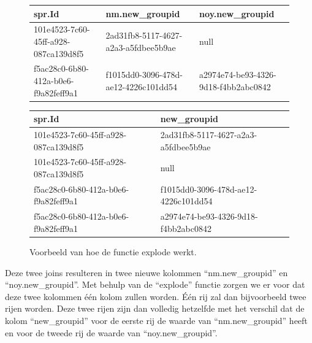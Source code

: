 \begin{figure}[H]%
    \centering
    \begin{tabularx}{0.9\textwidth}{ |X|X|X| }
        \hline
        \textbf{spr.Id} & \textbf{nm.new\_groupid} & \textbf{noy.new\_groupid} \\
        \hline 
        101e4523-7c60-45ff-a928-087ca139d8f5  & 2ad31fb8-5117-4627-a2a3-a5fdbee5b9ae & null  \\
        \hline
        f5ac28c0-6b80-412a-b0e6-f9a82feff9a1 & f1015dd0-3096-478d-ae12-4226c101dd54 & a2974e74-be93-4326-9d18-f4bb2abc0842 \\
        \hline
    \end{tabularx}
    
    \Bigg\downarrow
    
    \begin{tabularx}{0.9\textwidth}{ |X|X| }
        \hline
        \textbf{spr.Id} & \textbf{new\_groupid} \\
        \hline 
        101e4523-7c60-45ff-a928-087ca139d8f5  & 2ad31fb8-5117-4627-a2a3-a5fdbee5b9ae  \\
        \hline
        101e4523-7c60-45ff-a928-087ca139d8f5  & null  \\
        \hline
        f5ac28c0-6b80-412a-b0e6-f9a82feff9a1 & f1015dd0-3096-478d-ae12-4226c101dd54 \\
        \hline
        f5ac28c0-6b80-412a-b0e6-f9a82feff9a1 & a2974e74-be93-4326-9d18-f4bb2abc0842 \\
        \hline
    \end{tabularx}
    \caption{Voorbeeld van hoe de functie explode werkt.}
\end{figure}

Deze twee joins resulteren in twee nieuwe kolommen ``nm.new\_groupid'' en ``noy.new\_groupid''. Met behulp van de ``explode'' functie zorgen we er voor dat deze twee kolommen één kolom zullen worden. Één rij zal dan bijvoorbeeld twee rijen worden. Deze twee rijen zijn dan volledig hetzelfde met het verschil dat de kolom ``new\_groupid'' voor de eerste rij de waarde van ``nm.new\_groupid'' heeft en voor de tweede rij de waarde van ``noy.new\_groupid''.


